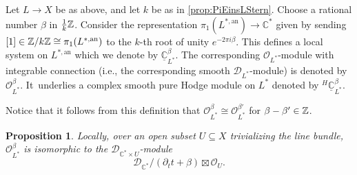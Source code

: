\documentclass[11pt]{article}
\newcommand{\ie}{i.e.,\xspace}
\let\mathds\mathbb
\newtheorem{prop}[thm]{Proposition}
\newcommand{\dC}{{\mathds C}}\let\C\dC
\newcommand{\cD}{\mathscr{D}}
\newcommand{\cO}{\mathcal{O}}\let\O\cO
\begin{document}
\begin{dfn}\label{def:Obeta-new}
Let $L\to X$ be as above, and let $k$ be as in \cref{prop:PiEinsLStern}.
Choose a rational number $\beta$ in $\frac{1}{k}\Z$. Consider the representation $\pi_1(L^{*,\mathrm{an}}) \to \dC^*$ given by sending $[1]\in\Z/k\Z \cong\pi_1(L^{*,\mathrm{an}})$ to the $k$-th root of unity
$e^{-2\pi i \beta}$. This defines a local system on $L^{*,\mathrm{an}}$ which we denote by $\underline{\dC}^\beta_{L^*}$. The corresponding $\cO_{L^*}$\nobreakdash-mod\-ule with integrable connection
(\ie the corresponding smooth $\cD_{L^*}$\nobreakdash-mod\-ule) is denoted
by $\cO_{L^*}^\beta$. It~underlies a complex smooth pure Hodge module on $L^*$ denoted by $^{H\!}\underline{\dC}^\beta_{L^*}$.
\end{dfn}
Notice that it follows from this definition that $\cO_{L^*}^\beta\cong \cO_{L^*}^{\beta'}$ for $\beta-\beta'\in \Z$.

\begin{prop}\label{prop:ObetaExtProd}
Locally, over an open subset $U \subseteq X$ trivializing the line bundle, $\O_{L^*}^\beta$ is isomorphic to the $\mathscr D_{\C^* \times U}$\nobreakdash-mod\-ule
\[
\mathscr D_{\C^*}/(\partial_t t + \beta) \boxtimes \O_U.
\]
\end{prop}
\end{document}
